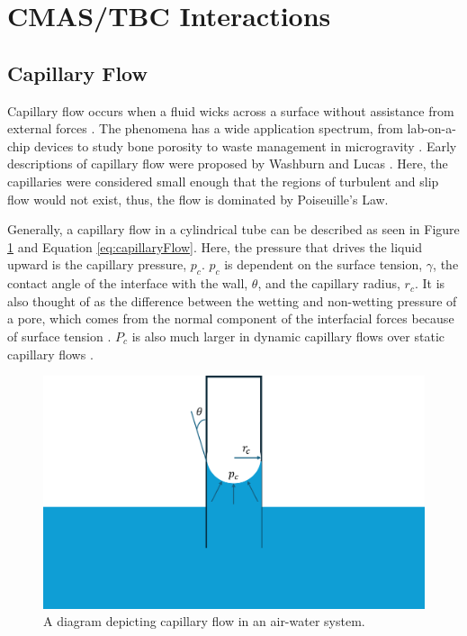 \documentclass{UCF_ETD}
\begin{document}
\section{CMAS/TBC Interactions}
\label{sec:CMAS/TBC_background}

\subsection{Capillary Flow}

Capillary flow occurs when a fluid wicks across a surface without assistance from external forces \cite{kolliopoulos2021capillary}. The phenomena has a wide application spectrum, from lab-on-a-chip devices to study bone porosity \cite{SylvainTaylor} to waste management in microgravity \cite{McCraney}. Early descriptions of capillary flow were proposed by Washburn \cite{Washburn19213} and Lucas \cite{lucas1918ueber}. Here, the capillaries were considered small enough that the regions of turbulent and slip flow would not exist, thus, the flow is dominated by Poiseuille's Law.

Generally, a capillary flow in a cylindrical tube can be described as seen in Figure \ref{fig:capillaryFlowDioagram} and Equation \ref{eq:capillaryFlow}. Here, the pressure that drives the liquid upward is the capillary pressure, $p_{c}$. $p_{c}$ is dependent on the surface tension, $\gamma$, the contact angle of the interface with the wall, $\theta$, and the capillary radius, $r_{c}$. It is also thought of as the difference between the wetting and non-wetting pressure of a pore, which comes from the normal component of the interfacial forces because of surface tension \cite{Chen2022}. $P_{c}$ is also much larger in dynamic capillary flows over static capillary flows \cite{Chen2022}.

\begin{figure}[htp!]
    \centering
    \includegraphics[width=.9\textwidth]{Figures/capillaryFlowDiagram.png}
    \caption{A diagram depicting capillary flow in an air-water system.}
    \label{fig:capillaryFlowDioagram}
\end{figure}
\end{document}
